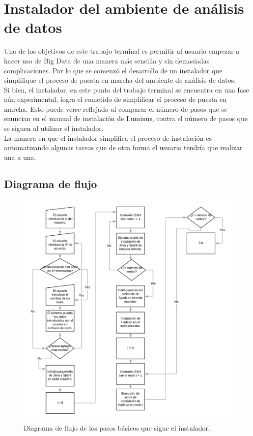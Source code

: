 \section{Instalador del ambiente de análisis de datos}
Uno de los objetivos de este trabajo terminal es permitir al usuario empezar a hacer uso de Big Data de una manera más sencilla y sin demasiadas complicaciones. Por lo que se comenzó el desarrollo de un instalador que simplifique el proceso de puesta en marcha del ambiente de análisis de datos.\\

Si bien, el instalador, en este punto del trabajo terminal se encuentra en una fase aún experimental, logra el cometido de simplificar el proceso de puesta en marcha. Esto puede verse reflejado al comparar el número de pasos que se enuncian en el manual de instalación de Luminus, contra el número de pasos que se siguen al utilizar el instalador.\\

La manera en que el instalador simplifica el proceso de instalación es automatizando algunas tareas que de otra forma el usuario tendría que realizar una a una.\\

\subsection{Diagrama de flujo}
\begin{figure}[H]
	\hypertarget{fig:diagramaFlujo}{\hspace{1pt}}
	\begin{center}
		\includegraphics{capitulo5/images/diagramaFlujo.png}
		\caption{Diagrama de flujo de los pasos básicos que sigue el instalador.}
	\end{center}
\end{figure}

